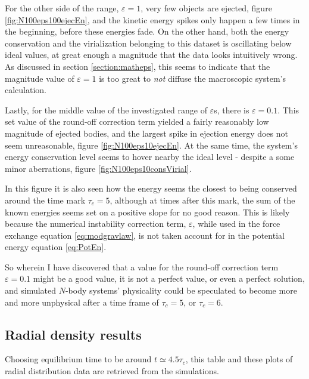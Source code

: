 \documentclass[11pt,a4paper,notitlepage,twocolumn]{article}
\begin{document}
For the other side of the range, $\varepsilon = 1$, very few objects are ejected, figure \ref{fig:N100eps100ejecEn}, and the kinetic energy spikes only happen a few times in the beginning, before these energies fade. On the other hand, both the energy conservation and the virialization belonging to this dataset is oscillating below ideal values, at great enough a magnitude that the data looks intuitively wrong. As discussed in section \ref{section:matheps}, this seems to indicate that the magnitude value of $\varepsilon = 1$ is too great to \textit{not} diffuse the macroscopic system's calculation.

Lastly, for the middle value of the investigated range of $\varepsilon$s, there is $\varepsilon = 0.1$. This set value of the round-off correction term yielded a fairly reasonably low magnitude of ejected bodies, and the largest spike in ejection energy does not seem unreasonable, figure \ref{fig:N100eps10ejecEn}. At the same time, the system's energy conservation level seems to hover nearby the ideal level - despite a some minor aberrations, figure \ref{fig:N100eps10consVirial}.

In this figure it is also seen how the energy seems the closest to being conserved around the time mark $\tau_c = 5$, although at times after this mark, the sum of the known energies seems set on a positive slope for no good reason. This is likely because the numerical instability correction term, $\varepsilon$, while used in the force exchange equation \ref{eq:modgravlaw}, is not taken account for in the potential energy equation \ref{eq:PotEn}.

So wherein I have discovered that a value for the round-off correction term $\varepsilon = 0.1$ might be a good value, it is not a perfect value, or even a perfect solution, and simulated $N$-body systems' physicality could be speculated to become more and more unphysical after a time frame of $\tau_c = 5$, or $\tau_c = 6$.

\subsection{Radial density results}
Choosing equilibrium time to be around $t \simeq 4.5\tau_c$, this table and these plots of radial distribution data are retrieved from the simulations.
\end{document}
